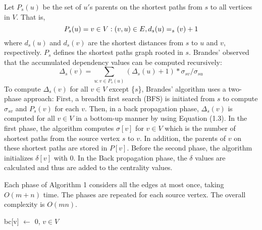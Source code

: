 \documentclass[MTech]{iitmdiss}
\begin{document}
Let $P_{s}(u)$ be the set of $u'$s parents on the shortest paths from $s$ to all vertices in $V$. That is,\[  P_{s}(u) = \\{v \in V : (v, u) \in E, d_{s}(u)=_{s}(v)+ 1\\} \]
where $d_{s}(u)$ and $d_{s}(v)$ are the shortest distances from $s$ to $u$ and $v$, respectively.
$P_{s}$ defines the shortest paths graph rooted in $s$. Brandes' observed that the accumulated dependency values can be computed recursively:
\begin{equation} \label{eq3}
\Delta_{s}(v) = \sum_{u:v \in P_{s}(u)} (\Delta_{s}(u)+1)*\sigma_{sv}/\sigma_{su}
\end{equation}
To compute $\Delta_{s}(v)$ for all $v \in V$ except \{$s$\}, Brandes' algorithm uses a two-phase approach: First, a breadth first search (BFS) is initiated from $s$ to compute $\sigma_{sv}$ and $P_{s}(v)$ for each $v$. Then, in a back propagation phase, $\Delta_{s}(v)$ is computed for all $v \in V$ in a bottom-up manner by using Equation (1.3).
In the first phase, the algorithm computes $\sigma[v]$ for $v \in V$ which is the number of shortest paths from the source vertex $s$ to $v$. In addition, the parents of $v$ on these shortest paths are stored in $P[v]$. Before the second phase, the algorithm initializes $\delta[v]$ with 0. 
In the Back propagation phase, the $\delta$  values are calculated and thus are added to the centrality values.

Each phase of Algorithm 1 considers all the edges at most once, taking $O(m + n)$ time. The phases are repeated for each source vertex. The overall complexity is $O(mn)$.

\begin{algorithm}

bc[v] $\leftarrow$ 0, $v \in V$\;
\end{algorithm}
\end{document}
